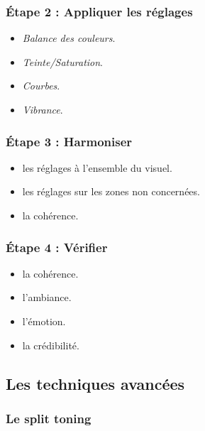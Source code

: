 \subsubsection{Étape 2 : Appliquer les réglages}

\begin{itemize}
    \item {} \emph{Balance des couleurs}.
    \item {} \emph{Teinte/Saturation}.
    \item {} \emph{Courbes}.
    \item {} \emph{Vibrance}.
\end{itemize}

\subsubsection{Étape 3 : Harmoniser}

\begin{itemize}
    \item {} les réglages à l'ensemble du visuel.
    \item {} les réglages sur les zones non concernées.
    \item {} la cohérence.
\end{itemize}

\subsubsection{Étape 4 : Vérifier}

\begin{itemize}
    \item {} la cohérence.
    \item {} l'ambiance.
    \item {} l'émotion.
    \item {} la crédibilité.
\end{itemize}

\subsection{Les techniques avancées}

\subsubsection{Le split toning}

